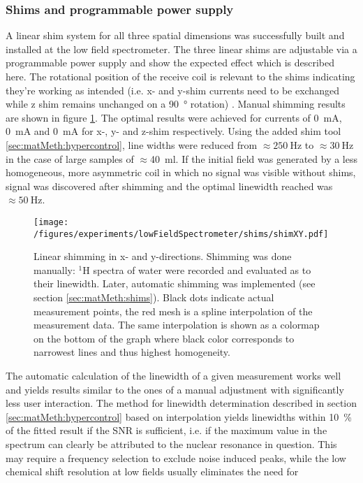          \subsubsection{Shims and programmable power supply}
         A linear shim system for all three spatial dimensions was successfully built and installed at the low field spectrometer.
         The three linear shims are adjustable via a programmable power supply and show the expected effect which is described here. The rotational position of the receive coil is relevant to the shims indicating they're working as intended (i.e. x- and y-shim currents need to be exchanged while z shim remains unchanged on a \SI{90}{\degree} rotation) . Manual shimming results are shown in figure \ref{fig:results:lowFieldSpectrometer:shims}. The optimal results were achieved for currents of \SI{0}{\milli\ampere},  \SI{0}{\milli\ampere} and \SI{0}{\milli\ampere} for x-, y- and z-shim respectively. Using the added shim tool \ref{sec:matMeth:hypercontrol}, line widths were reduced from $\approx \SI{250}{\hertz}$ to $\approx \SI{30}{\hertz}$ in the case of large samples of $\approx $\SI{40}{\milli\litre}. If the initial field was generated by a less homogeneous, more asymmetric coil in which no signal was visible without shims, signal was discovered after shimming and the optimal linewidth reached was $\approx \SI{50}{\hertz}$.
            \begin{figure}
                \texttt{[image: /figures/experiments/lowFieldSpectrometer/shims/shimXY.pdf]}
                \caption[Manual low field shimming]{Linear shimming in x- and y-directions. Shimming was done manually: $^{1}$H spectra of water were recorded and evaluated as to their linewidth. Later, automatic shimming was implemented (see section \ref{sec:matMeth:shims}). Black dots indicate actual measurement points, the red mesh is a spline interpolation of the measurement data. The same interpolation is shown as a colormap on the bottom of the graph where black color corresponds to narrowest lines and thus highest homogeneity.}
                \label{fig:results:lowFieldSpectrometer:shims}
            \end{figure}
            The automatic calculation of the linewidth of a given measurement works well and yields results similar to the ones of a manual adjustment with significantly less user interaction. The method for linewidth determination described in section \ref{sec:matMeth:hypercontrol} based on interpolation yields linewidths within \SI{10}{\percent} of the fitted result if the SNR is sufficient, i.e. if the maximum value in the spectrum can clearly be attributed to the nuclear resonance in question. This may require a frequency selection to exclude noise induced peaks, while the low chemical shift resolution at low fields usually eliminates the need for 
